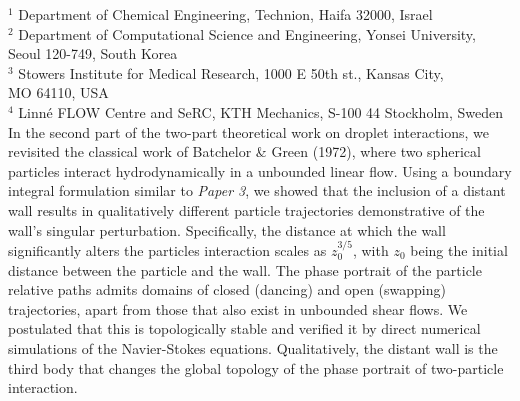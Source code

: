 %
%
%
%
%
%
%
\paperaffiliation
{%
  $^1$ Department of Chemical Engineering, Technion, Haifa 32000, Israel\\%
  $^2$ Department of Computational Science and Engineering, Yonsei University, \\Seoul 120-749, South Korea\\%
  $^3$ Stowers Institute for Medical Research, 1000 E 50th st., Kansas City, \\MO 64110, USA\\%
  $^4$ Linn\'e FLOW Centre and SeRC, KTH Mechanics, S-100 44 Stockholm, Sweden%
}%
%
%
%
\papervolume{}%
%
\papernumber{}
%
\paperpages{}%
%
\paperyear{}%
%
\papersummary%
{%
   In the second part of the two-part theoretical work on droplet interactions, we revisited the classical work of Batchelor \& Green (1972), where two spherical particles interact hydrodynamically in a unbounded linear flow. Using a boundary integral formulation similar to \emph{Paper 3}, we showed that the inclusion of a distant wall results in qualitatively different particle trajectories demonstrative of the wall's singular perturbation. Specifically, the distance at which the wall significantly alters the particles interaction scales as $z_0^{3/5}$, with $z_0$ being the initial distance between the particle and the wall. The phase portrait of the particle relative paths admits domains of closed (dancing) and open (swapping) trajectories, apart from those that also exist in unbounded shear flows. We postulated that this is topologically stable and verified it by direct numerical simulations of the Navier-Stokes equations. Qualitatively, the distant wall is the third body that changes the global topology of the phase portrait of two-particle interaction.
}%
